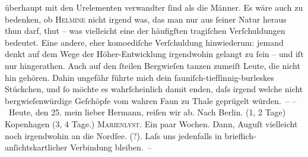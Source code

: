                überhaupt mit den Urelementen verwandter{ }ſind als die Männer. Es wäre auch zu
               bedenken, ob \textsc{Helmine} nicht irgend was, das man nur aus {\pb}ſeiner Natur heraus
               thun darf, \label{K_L01604-2v}\label{K_L01604-2} thut – was
               vielleicht eine der häufigſten tragiſchen Verſchuldungen bedeutet. Eine andere, eher
               komoediſche Verſchuldung hinwiederum: jemand denkt auf dem Wege der \introOben{}Höher-\introOben{}Entwicklung irgendwohin gelangt  zu{ }ſein – und iſt nur \label{K_L01604-3v}\label{K_L01604-3} hingerathen.
               Auch auf den{ }ſteilen Bergwieſen tanzen zumeiſt Leute, die nicht hin gehören. Dahin
               ungefähr führte mich dein fauniſch-tiefſinnig-burleskes Stückchen, und{ }ſo möchte es wahrſcheinlich
               damit {\pb}enden, daſs
               irgend welche nicht bergwieſenwürdige Geſchöpfe vom wahren Faun zu Thale geprügelt
               würden. –\pend
           \vspace{1em}
\pstart
           \noindent{}– Heute, \introOben{}den 25.\introOben{} mein lieber Hermann, reiſen wir ab. Nach
                  Berlin. (1, 2 Tage) Kopenhagen (3, 4 Tage.) \textsc{Marienlyst}. Ein paar Wochen. Dann, Auguſt vielleicht noch irgendwohin an die Nordſee. (\label{K_L01604-4v}\label{K_L01604-4}?). Laſs uns jedenfalls in brieflich-anſichtskartlicher Verbindung
               bleiben. –\pend
           

